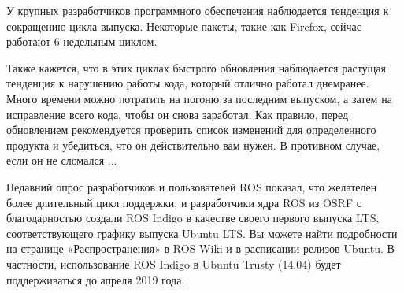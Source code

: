 

У крупных разработчиков программного обеспечения наблюдается тенденция к сокращению цикла выпуска. Некоторые пакеты, такие как Firefox, сейчас работают 6-недельным циклом.

Также кажется, что в этих циклах быстрого обновления наблюдается растущая тенденция к нарушению работы кода, который отлично работал днем ​​ранее. Много времени можно потратить на погоню за последним выпуском, а затем на исправление всего кода, чтобы он снова заработал. Как правило, перед обновлением рекомендуется проверить список изменений для определенного продукта и убедиться, что он действительно вам нужен. В противном случае, если он не сломался ...

Недавний опрос разработчиков и пользователей ROS показал, что желателен более длительный цикл поддержки, и разработчики ядра ROS из OSRF с благодарностью создали ROS Indigo в качестве своего первого выпуска LTS, соответствующего графику выпуска Ubuntu LTS. Вы можете найти подробности на \href{http://wiki.ros.org/Distributions}{странице} «Распространения» в ROS Wiki и в расписании \href{https://wiki.ubuntu.com/Releases}{релизов} Ubuntu. В частности, использование ROS Indigo в Ubuntu Trusty (14.04) будет поддерживаться до апреля 2019 года.

